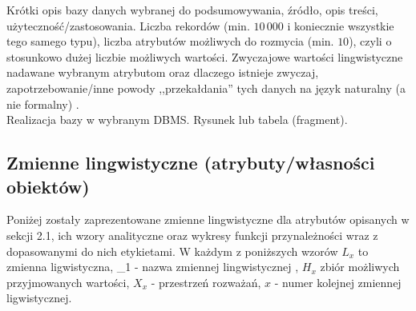 \documentclass{article}
\begin{document}
Krótki opis bazy danych wybranej do podsumowywania, źródło, opis treści,
użyteczność/zastosowania. Liczba rekordów (min. $10\,000$ i koniecznie wszystkie tego
samego typu), liczba atrybutów możliwych do rozmycia (min. $10$), czyli o stosunkowo dużej
liczbie możliwych wartości. Zwyczajowe wartości lingwistyczne nadawane wybranym
atrybutom oraz dlaczego istnieje zwyczaj, zapotrzebowanie/inne powody
,,przekałdania'' tych danych na język
naturalny (a nie formalny) \cite{niewiadomski19, niewiadomski08}.\\
Realizacja bazy w wybranym DBMS. Rysunek lub tabela (fragment).

\subsection{Zmienne lingwistyczne (atrybuty/własności obiektów)}
Poniżej zostały zaprezentowane zmienne lingwistyczne dla atrybutów opisanych w sekcji 2.1, ich wzory analityczne oraz wykresy funkcji przynależności wraz z dopasowanymi do nich etykietami. W każdym z poniższych wzorów \(L_x\) to zmienna ligwistyczna, \_1 - nazwa zmiennej lingwistycznej , \(H_x\) zbiór możliwych przyjmowanych wartości, \(X_x\) - przestrzeń rozważań, \(x\) - numer kolejnej zmiennej ligwistycznej. 
\end{document}
